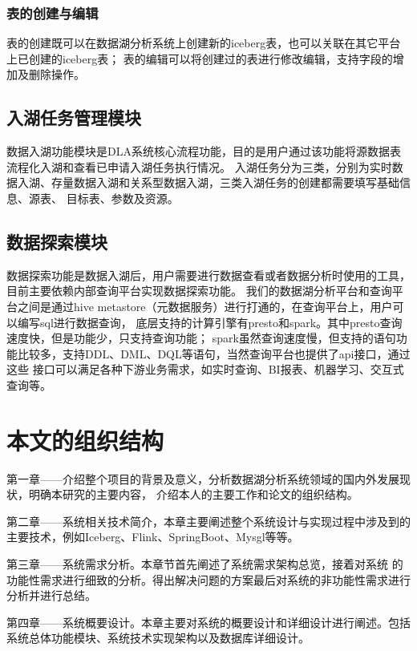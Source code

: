 \subsubsection{表的创建与编辑}

表的创建既可以在数据湖分析系统上创建新的iceberg表，也可以关联在其它平台上已创建的iceberg表；
表的编辑可以将创建过的表进行修改编辑，支持字段的增加及删除操作。

\subsection{入湖任务管理模块}

数据入湖功能模块是DLA系统核心流程功能，目的是用户通过该功能将源数据表流程化入湖和查看已申请入湖任务执行情况。
入湖任务分为三类，分别为实时数据入湖、存量数据入湖和关系型数据入湖，三类入湖任务的创建都需要填写基础信息、源表、
目标表、参数及资源。

\subsection{数据探索模块}

数据探索功能是数据入湖后，用户需要进行数据查看或者数据分析时使用的工具，目前主要依赖内部查询平台实现数据探索功能。
我们的数据湖分析平台和查询平台之间是通过hive metastore（元数据服务）进行打通的，在查询平台上，用户可以编写sql进行数据查询，
底层支持的计算引擎有presto和spark。其中presto查询速度快，但是功能少，只支持查询功能；
spark虽然查询速度慢，但支持的语句功能比较多，支持DDL、DML、DQL等语句，当然查询平台也提供了api接口，通过这些
接口可以满足各种下游业务需求，如实时查询、BI报表、机器学习、交互式查询等。

\section{本文的组织结构}

第一章——介绍整个项目的背景及意义，分析数据湖分析系统领域的国内外发展现状，明确本研究的主要内容，
介绍本人的主要工作和论文的组织结构。

第二章——系统相关技术简介，本章主要阐述整个系统设计与实现过程中涉及到的主要技术，例如Iceberg、Flink、SpringBoot、Mysgl等等。

第三章——系统需求分析。本章节首先阐述了系统需求架构总览，接着对系统
的功能性需求进行细致的分析。得出解决问题的方案最后对系统的非功能性需求进行分析并进行总结。

第四章——系统概要设计。本章主要对系统的概要设计和详细设计进行阐述。包括系统总体功能模块、系统技术实现架构以及数据库详细设计。

